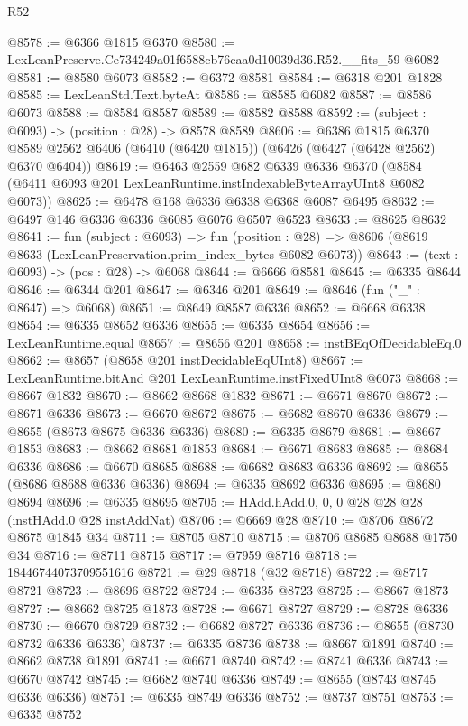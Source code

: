 \begin{lexlean}{R52}
\begin{coremodule}
@8578 := @6366 @1815 @6370
@8580 := LexLeanPreserve.Ce734249a01f6588cb76caa0d10039d36.R52.__fits_59 @6082
@8581 := @8580 @6073
@8582 := @6372 @8581
@8584 := @6318 @201 @1828
@8585 := LexLeanStd.Text.byteAt
@8586 := @8585 @6082
@8587 := @8586 @6073
@8588 := @8584 @8587
@8589 := @8582 @8588
@8592 := (subject : @6093) -> (position : @28) -> @8578 @8589
@8606 := @6386
    @1815
    @6370
    @8589
    @2562
    @6406
    (@6410 (@6420 @1815))
    (@6426 (@6427 (@6428 @2562) @6370 @6404))
@8619 := @6463
    @2559
    @682
    @6339
    @6336
    @6370
    (@8584 (@6411 @6093 @201 LexLeanRuntime.instIndexableByteArrayUInt8 @6082 @6073))
@8625 := @6478 @168 @6336 @6338 @6368 @6087 @6495
@8632 := @6497 @146 @6336 @6336 @6085 @6076 @6507 @6523
@8633 := @8625 @8632
@8641 := fun (subject : @6093) =>
  fun (position : @28) => @8606 (@8619 @8633 (LexLeanPreservation.prim_index_bytes @6082 @6073))
@8643 := (text : @6093) -> (pos : @28) -> @6068
@8644 := @6666 @8581
@8645 := @6335 @8644
@8646 := @6344 @201
@8647 := @6346 @201
@8649 := @8646 (fun ("_" : @8647) => @6068)
@8651 := @8649 @8587 @6336
@8652 := @6668 @6338
@8654 := @6335 @8652 @6336
@8655 := @6335 @8654
@8656 := LexLeanRuntime.equal
@8657 := @8656 @201
@8658 := instBEqOfDecidableEq.{0}
@8662 := @8657 (@8658 @201 instDecidableEqUInt8)
@8667 := LexLeanRuntime.bitAnd @201 LexLeanRuntime.instFixedUInt8 @6073
@8668 := @8667 @1832
@8670 := @8662 @8668 @1832
@8671 := @6671 @8670
@8672 := @8671 @6336
@8673 := @6670 @8672
@8675 := @6682 @8670 @6336
@8679 := @8655 (@8673 @8675 @6336 @6336)
@8680 := @6335 @8679
@8681 := @8667 @1853
@8683 := @8662 @8681 @1853
@8684 := @6671 @8683
@8685 := @8684 @6336
@8686 := @6670 @8685
@8688 := @6682 @8683 @6336
@8692 := @8655 (@8686 @8688 @6336 @6336)
@8694 := @6335 @8692 @6336
@8695 := @8680 @8694
@8696 := @6335 @8695
@8705 := HAdd.hAdd.{0, 0, 0} @28 @28 @28 (instHAdd.{0} @28 instAddNat)
@8706 := @6669 @28
@8710 := @8706 @8672 @8675 @1845 @34
@8711 := @8705 @8710
@8715 := @8706 @8685 @8688 @1750 @34
@8716 := @8711 @8715
@8717 := @7959 @8716
@8718 := 18446744073709551616
@8721 := @29 @8718 (@32 @8718)
@8722 := @8717 @8721
@8723 := @8696 @8722
@8724 := @6335 @8723
@8725 := @8667 @1873
@8727 := @8662 @8725 @1873
@8728 := @6671 @8727
@8729 := @8728 @6336
@8730 := @6670 @8729
@8732 := @6682 @8727 @6336
@8736 := @8655 (@8730 @8732 @6336 @6336)
@8737 := @6335 @8736
@8738 := @8667 @1891
@8740 := @8662 @8738 @1891
@8741 := @6671 @8740
@8742 := @8741 @6336
@8743 := @6670 @8742
@8745 := @6682 @8740 @6336
@8749 := @8655 (@8743 @8745 @6336 @6336)
@8751 := @6335 @8749 @6336
@8752 := @8737 @8751
@8753 := @6335 @8752

\end{coremodule}
\end{lexlean}
